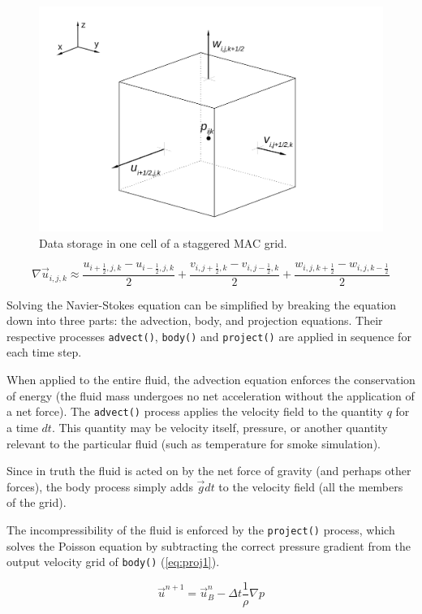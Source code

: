 \documentclass[12pt]{article}
\begin{document}
\begin{figure}[h]
\centering
\includegraphics[width=0.7\linewidth]{mac_grid.pdf}
\caption{Data storage in one cell of a staggered MAC grid.}
\label{fig:MACgrid}
\end{figure}

\begin{equation}
\nabla\vec{u}_{i,j,k}\approx\frac{u_{i+\frac{1}{2},j,k}-u_{i-\frac{1}{2},j,k}}{2}+\frac{v_{i,j+\frac{1}{2},k}-v_{i,j-\frac{1}{2},k}}{2}+\frac{w_{i,j,k+\frac{1}{2}}-w_{i,j,k-\frac{1}{2}}}{2}
\label{eq:velDiv}
\end{equation}

Solving the Navier-Stokes equation can be simplified by breaking the equation down into three parts: the advection, body, and projection equations. Their respective processes \texttt{advect()}, \texttt{body()} and \texttt{project()} are applied in sequence for each time step.

When applied to the entire fluid, the advection equation enforces the conservation of energy (the fluid mass undergoes no net acceleration without the application of a net force). The \texttt{advect()} process applies the velocity field to the quantity $q$ for a time $dt$. This quantity may be velocity itself, pressure, or another quantity relevant to the particular fluid (such as temperature for smoke simulation).

Since in truth the fluid is acted on by the net force of gravity (and perhaps other forces), the body process simply adds $\vec{g}dt$ to the velocity field (all the members of the grid).

The incompressibility of the fluid is enforced by the \texttt{project()} process, which solves the Poisson equation by subtracting the correct pressure gradient from the output velocity grid of \texttt{body()} (\ref{eq:proj1}).

\begin{equation}
\vec{u}^{n+1}=\vec{u}_B^n-\Delta t\frac{1}{\rho}\nabla p
\label{eq:proj1}
\end{equation}
\end{document}
